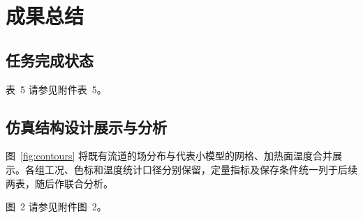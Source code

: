 \documentclass[stage2,fontset=fandol]{ydzjreport}
\makeatletter
\newcommand{\submissionnumber}[1]{\def\@currentlabel{#1}}
\makeatother
\begin{document}

\section{成果总结}

\subsection{任务完成状态}


\par\noindent \begingroup\submissionnumber{5}\label{tab:tasks}\endgroup 表~5 请参见附件表~5。\par


\subsection{仿真结构设计展示与分析}

图~\ref{fig:contours} 将既有流道的场分布与代表小模型的网格、加热面温度合并展示。各组工况、色标和温度统计口径分别保留，定量指标及保存条件统一列于后续两表，随后作联合分析。


\par\noindent \begingroup\submissionnumber{2a}\label{fig:zhixian-t}\endgroup \begingroup\submissionnumber{2b}\label{fig:zhixian-p}\endgroup \begingroup\submissionnumber{2c}\label{fig:zhixian-v}\endgroup \begingroup\submissionnumber{2d}\label{fig:zhixian-cu}\endgroup \begingroup\submissionnumber{2e}\label{fig:sin-t}\endgroup \begingroup\submissionnumber{2f}\label{fig:sin-p}\endgroup \begingroup\submissionnumber{2g}\label{fig:sin-v}\endgroup \begingroup\submissionnumber{2h}\label{fig:sin-cu}\endgroup \begingroup\submissionnumber{2i}\label{fig:naca-t}\endgroup \begingroup\submissionnumber{2j}\label{fig:naca-p}\endgroup \begingroup\submissionnumber{2k}\label{fig:naca-v}\endgroup \begingroup\submissionnumber{2l}\label{fig:naca-cu}\endgroup \begingroup\submissionnumber{2m}\label{fig:gao-t}\endgroup \begingroup\submissionnumber{2n}\label{fig:gao-p}\endgroup \begingroup\submissionnumber{2o}\label{fig:gao-v}\endgroup \begingroup\submissionnumber{2p}\label{fig:gao-cu}\endgroup \begingroup\submissionnumber{2}\label{fig:contours}\endgroup 图~2 请参见附件图~2。\par
\end{document}

